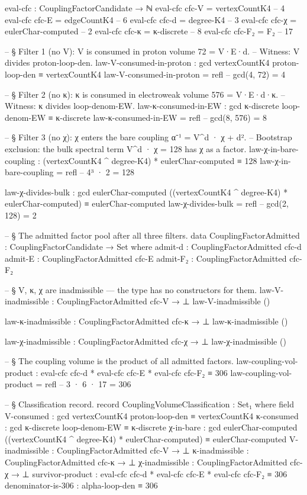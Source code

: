 \documentclass[11pt,a4paper]{book}
\begin{document}
\begin{code}
eval-cfc : CouplingFactorCandidate → ℕ
eval-cfc cfc-V  = vertexCountK4        -- 4
eval-cfc cfc-E  = edgeCountK4          -- 6
eval-cfc cfc-d  = degree-K4            -- 3
eval-cfc cfc-χ  = eulerChar-computed   -- 2
eval-cfc cfc-κ  = κ-discrete           -- 8
eval-cfc cfc-F₂ = F₂                   -- 17

-- § Filter 1 (no V): V is consumed in proton volume 72 = V·E·d.
-- Witness: V divides proton-loop-den.
law-V-consumed-in-proton : gcd vertexCountK4 proton-loop-den ≡ vertexCountK4
law-V-consumed-in-proton = refl  -- gcd(4, 72) = 4

-- § Filter 2 (no κ): κ is consumed in electroweak volume 576 = V·E·d·κ.
-- Witness: κ divides loop-denom-EW.
law-κ-consumed-in-EW : gcd κ-discrete loop-denom-EW ≡ κ-discrete
law-κ-consumed-in-EW = refl  -- gcd(8, 576) = 8

-- § Filter 3 (no χ): χ enters the bare coupling α⁻¹ = V^d · χ + d².
-- Bootstrap exclusion: the bulk spectral term V^d · χ = 128 has χ as a factor.
law-χ-in-bare-coupling : (vertexCountK4 ^ degree-K4) * eulerChar-computed ≡ 128
law-χ-in-bare-coupling = refl  -- 4³ · 2 = 128

law-χ-divides-bulk : gcd eulerChar-computed ((vertexCountK4 ^ degree-K4) * eulerChar-computed) ≡ eulerChar-computed
law-χ-divides-bulk = refl  -- gcd(2, 128) = 2

-- § The admitted factor pool after all three filters.
data CouplingFactorAdmitted : CouplingFactorCandidate → Set where
  admit-d  : CouplingFactorAdmitted cfc-d
  admit-E  : CouplingFactorAdmitted cfc-E
  admit-F₂ : CouplingFactorAdmitted cfc-F₂

-- § V, κ, χ are inadmissible — the type has no constructors for them.
law-V-inadmissible : CouplingFactorAdmitted cfc-V → ⊥
law-V-inadmissible ()

law-κ-inadmissible : CouplingFactorAdmitted cfc-κ → ⊥
law-κ-inadmissible ()

law-χ-inadmissible : CouplingFactorAdmitted cfc-χ → ⊥
law-χ-inadmissible ()

-- § The coupling volume is the product of all admitted factors.
law-coupling-vol-product :
  eval-cfc cfc-d * eval-cfc cfc-E * eval-cfc cfc-F₂ ≡ 306
law-coupling-vol-product = refl  -- 3 · 6 · 17 = 306

-- § Classification record.
record CouplingVolumeClassification : Set₁ where
  field
    V-consumed      : gcd vertexCountK4 proton-loop-den ≡ vertexCountK4
    κ-consumed      : gcd κ-discrete loop-denom-EW ≡ κ-discrete
    χ-in-bare       : gcd eulerChar-computed ((vertexCountK4 ^ degree-K4) * eulerChar-computed) ≡ eulerChar-computed
    V-inadmissible  : CouplingFactorAdmitted cfc-V → ⊥
    κ-inadmissible  : CouplingFactorAdmitted cfc-κ → ⊥
    χ-inadmissible  : CouplingFactorAdmitted cfc-χ → ⊥
    survivor-product : eval-cfc cfc-d * eval-cfc cfc-E * eval-cfc cfc-F₂ ≡ 306
    denominator-is-306 : alpha-loop-den ≡ 306


\end{code}
\end{document}
